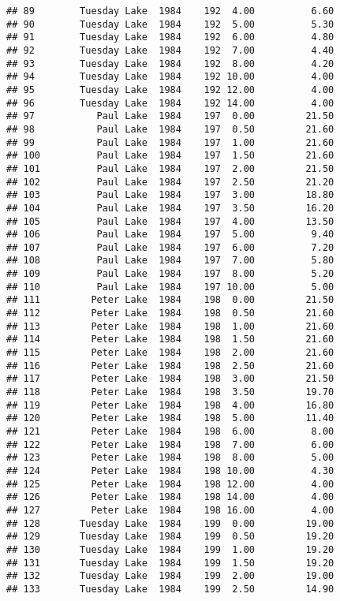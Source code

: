 \documentclass[
]{article}
\begin{document}
\begin{verbatim}
## 89        Tuesday Lake  1984    192  4.00          6.60
## 90        Tuesday Lake  1984    192  5.00          5.30
## 91        Tuesday Lake  1984    192  6.00          4.80
## 92        Tuesday Lake  1984    192  7.00          4.40
## 93        Tuesday Lake  1984    192  8.00          4.20
## 94        Tuesday Lake  1984    192 10.00          4.00
## 95        Tuesday Lake  1984    192 12.00          4.00
## 96        Tuesday Lake  1984    192 14.00          4.00
## 97           Paul Lake  1984    197  0.00         21.50
## 98           Paul Lake  1984    197  0.50         21.60
## 99           Paul Lake  1984    197  1.00         21.60
## 100          Paul Lake  1984    197  1.50         21.60
## 101          Paul Lake  1984    197  2.00         21.50
## 102          Paul Lake  1984    197  2.50         21.20
## 103          Paul Lake  1984    197  3.00         18.80
## 104          Paul Lake  1984    197  3.50         16.20
## 105          Paul Lake  1984    197  4.00         13.50
## 106          Paul Lake  1984    197  5.00          9.40
## 107          Paul Lake  1984    197  6.00          7.20
## 108          Paul Lake  1984    197  7.00          5.80
## 109          Paul Lake  1984    197  8.00          5.20
## 110          Paul Lake  1984    197 10.00          5.00
## 111         Peter Lake  1984    198  0.00         21.50
## 112         Peter Lake  1984    198  0.50         21.60
## 113         Peter Lake  1984    198  1.00         21.60
## 114         Peter Lake  1984    198  1.50         21.60
## 115         Peter Lake  1984    198  2.00         21.60
## 116         Peter Lake  1984    198  2.50         21.60
## 117         Peter Lake  1984    198  3.00         21.50
## 118         Peter Lake  1984    198  3.50         19.70
## 119         Peter Lake  1984    198  4.00         16.80
## 120         Peter Lake  1984    198  5.00         11.40
## 121         Peter Lake  1984    198  6.00          8.00
## 122         Peter Lake  1984    198  7.00          6.00
## 123         Peter Lake  1984    198  8.00          5.00
## 124         Peter Lake  1984    198 10.00          4.30
## 125         Peter Lake  1984    198 12.00          4.00
## 126         Peter Lake  1984    198 14.00          4.00
## 127         Peter Lake  1984    198 16.00          4.00
## 128       Tuesday Lake  1984    199  0.00         19.00
## 129       Tuesday Lake  1984    199  0.50         19.20
## 130       Tuesday Lake  1984    199  1.00         19.20
## 131       Tuesday Lake  1984    199  1.50         19.20
## 132       Tuesday Lake  1984    199  2.00         19.00
## 133       Tuesday Lake  1984    199  2.50         14.90

\end{verbatim}
\end{document}
